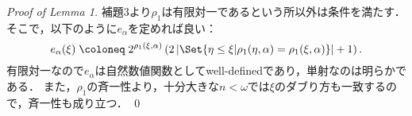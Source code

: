 \documentclass[a4j]{ltjsarticle}
\renewcommand{\defeq}{\mathrel{\coloneq}}
\begin{document}
\begin{proof}[Proof of Lemma 1]
 補題3より$\rho_1$は有限対一であるという所以外は条件を満たす．
 そこで，以下のように$e_\alpha$を定めれば良い：
 \[
  e_\alpha(\xi) \defeq 2^{\rho_1(\xi, \alpha)}
 \left( 2 \left|\Set{\eta \leq \xi | \rho_1(\eta, \alpha) = \rho_1(\xi, \alpha)}\right| + 1 \right).
 \]
 有限対一なので$e_\alpha$は自然数値関数としてwell-definedであり，単射なのは明らかである．
 また，$\rho_1$の斉一性より，十分大きな$n < \omega$では$\xi$のダブり方も一致するので，斉一性も成り立つ． \qed
\end{proof}

\nocite{Shelah:1984,Kunen:1980,Jech:2002}
\nocite{Bekkali:1991bv,Miyazaki:2013fv}
\printbibliography[title=参考文献]
\end{document}
